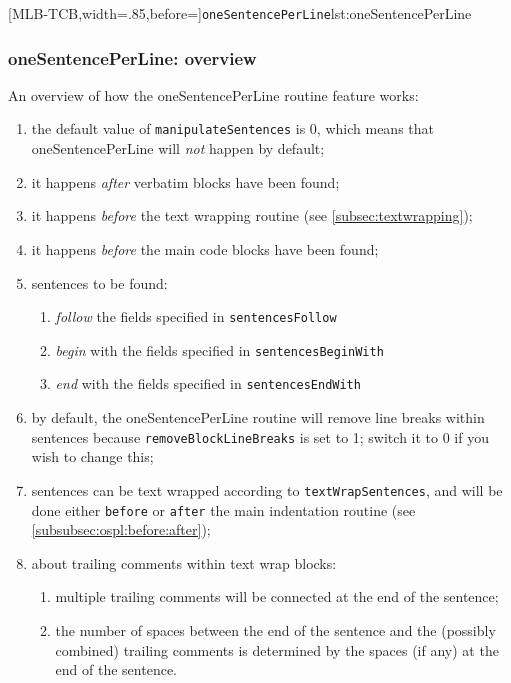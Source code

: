\documentclass[10pt]{article}
\begin{document}
 [MLB-TCB,width=.85\linewidth,before=\centering]{\texttt{oneSentencePerLine}}{lst:oneSentencePerLine}

\subsubsection{oneSentencePerLine: overview}
 An overview of how the oneSentencePerLine routine feature works:
 \begin{enumerate}
  \item the default value of \texttt{manipulateSentences} is 0, which means that
        oneSentencePerLine will \emph{not} happen by default;
  \item it happens \emph{after} verbatim blocks have been found;
  \item it happens \emph{before} the text wrapping routine (see
        \cref{subsec:textwrapping});
  \item it happens \emph{before} the main code blocks have been found;
  \item sentences to be found:
        \begin{enumerate}
         \item \emph{follow} the fields specified in \texttt{sentencesFollow}
         \item \emph{begin} with the fields specified in \texttt{sentencesBeginWith}
         \item \emph{end} with the fields specified in \texttt{sentencesEndWith}
        \end{enumerate}
  \item by default, the oneSentencePerLine routine will remove line breaks within
        sentences because \texttt{removeBlockLineBreaks} is set to 1; switch it to 0 if
        you wish to change this;
  \item sentences can be text wrapped according to \texttt{textWrapSentences}, and will
        be done either \texttt{before} or \texttt{after} the main indentation routine
        (see \cref{subsubsec:ospl:before:after});
  \item about trailing comments within text wrap blocks:
        \begin{enumerate}
         \item multiple trailing comments will be connected at the end of the sentence;
         \item the number of spaces between the end of the sentence and the (possibly
               combined) trailing comments is determined by the spaces (if any) at the
               end of the sentence.
        \end{enumerate}
 \end{enumerate}
\end{document}
